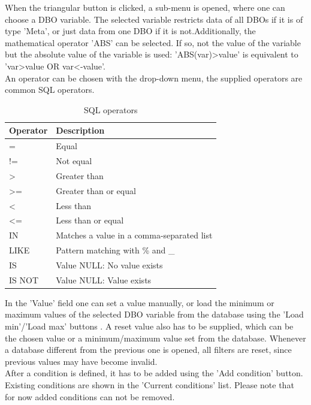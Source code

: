 When the triangular button is clicked, a sub-menu is opened, where one can choose a DBO variable. The selected variable restricts data of all DBOs if it is of type 'Meta', or just data from one DBO if it is not.Additionally, the mathematical operator 'ABS' can be selected. If so, not the value of the variable but the absolute value of the variable is used: 'ABS(var)>value' is equivalent to 'var>value OR var<-value'. \\

An operator can be chosen with the drop-down menu, the supplied operators are common SQL operators.

\begin{table}[H]
  \center
  \begin{tabular}{ | l | l |}
    \hline
    \textbf{Operator} & \textbf{Description} \\ \hline
    = & Equal \\ \hline
    != & Not equal \\ \hline
    > & Greater than \\ \hline
    >= & Greater than or equal \\ \hline
    < & Less than \\ \hline
    <= & Less than or equal \\ \hline
    IN & Matches a value in a comma-separated list \\ \hline
    LIKE & Pattern matching with \% and \_ \\ \hline
    IS & Value NULL: No value exists \\ \hline
    IS NOT & Value NULL: Value exists \\
    \hline
  \end{tabular}
  \caption{SQL operators}
\end{table}

In the 'Value' field one can set a value manually, or load the minimum or maximum values of the selected DBO variable from the database using the 'Load min'/'Load max' buttons . A reset value also has to be supplied, which can be the chosen value or a minimum/maximum value set from the database.  Whenever a database different from the previous one is opened, all filters are reset, since previous values may have become invalid.\\

After a condition is defined, it has to be added using the 'Add condition' button. Existing conditions are shown in the 'Current conditions' list. Please note that for now added conditions can not be removed.

